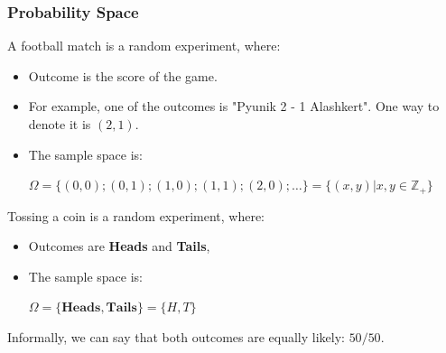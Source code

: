 \documentclass{beamer}
\begin{document}

\begin{frame}
\frametitle{Probability Space}
    
    \begin{example}
        A football match is a random experiment, where:
        \begin{itemize}
            \item Outcome is the score of the game.
            \item For example, one of the outcomes is "Pyunik 2 - 1 Alashkert". One way to denote it is $(2,1)$.
            \item The sample space is: \\
            \begin{center}
                $\Omega = \{(0,0); (0,1); (1,0); (1,1); (2,0); \dots\} = \{(x,y) \vert x,y \in \mathbb{Z}_+\}$
            \end{center}
        \end{itemize}
    \end{example}

    \pause
    \begin{example}
        Tossing a coin is a random experiment, where:
        \begin{itemize}
            \item Outcomes are \textbf{Heads} and \textbf{Tails},
            \item The sample space is:\\
           \begin{center}
               $\Omega = \{\textbf{Heads}, \textbf{Tails}\} = \{H, T\}$
           \end{center}
        \end{itemize}
    \end{example}

    \pause
    Informally, we can say that both outcomes are equally likely: $50/50$.

\end{frame}
\end{document}
